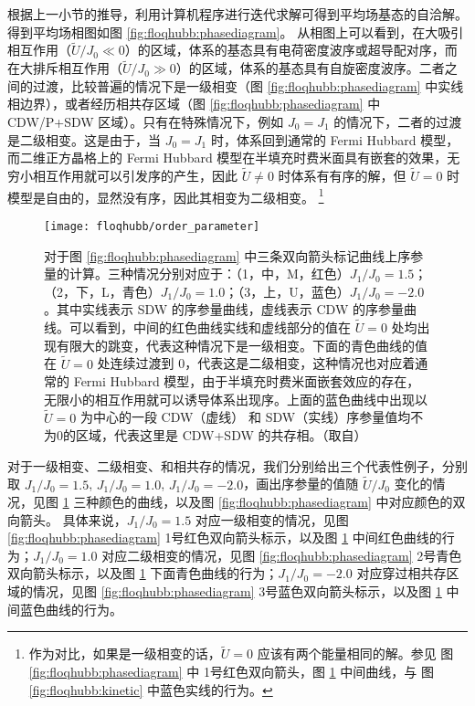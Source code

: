 根据上一小节的推导，利用计算机程序进行迭代求解可得到平均场基态的自洽解。得到平均场相图如图 \ref{fig:floqhubb:phasediagram}。
从相图上可以看到，在大吸引相互作用（$\tilde{U}/J_0\ll0$）的区域，体系的基态具有电荷密度波序或超导配对序，而在大排斥相互作用（$\tilde{U}/J_0\gg0$）的区域，体系的基态具有自旋密度波序。二者之间的过渡，比较普遍的情况下是一级相变（图 \ref{fig:floqhubb:phasediagram} 中实线相边界），或者经历相共存区域（图 \ref{fig:floqhubb:phasediagram} 中 CDW/P+SDW 区域）。只有在特殊情况下，例如 $J_0=J_1$ 的情况下，二者的过渡是二级相变。这是由于，当 $J_0=J_1$ 时，体系回到通常的 Fermi Hubbard 模型，而二维正方晶格上的 Fermi Hubbard 模型在半填充时费米面具有嵌套的效果，无穷小相互作用就可以引发序的产生，因此 $\tilde{U}\neq0$ 时体系有有序的解，但 $\tilde{U}=0$ 时模型是自由的，显然没有序，因此其相变为二级相变。
\footnote{作为对比，如果是一级相变的话，$\tilde{U}=0$ 应该有两个能量相同的解。参见
图 \ref{fig:floqhubb:phasediagram} 中 1号红色双向箭头，图 \ref{fig:floqhubb:orderparameter} 中间曲线，与
图 \ref{fig:floqhubb:kinetic} 中蓝色实线的行为。}

\begin{figure}[t]
\centering
\texttt{[image: floqhubb/order\_parameter]}
\caption{对于图 \ref{fig:floqhubb:phasediagram} 中三条双向箭头标记曲线上序参量的计算。三种情况分别对应于：（1，中，M，红色）$J_1/J_0=1.5$；（2，下，L，青色）$J_1/J_0=1.0$；（3，上，U，蓝色）$J_1/J_0=-2.0$。其中实线表示 SDW 的序参量曲线，虚线表示 CDW 的序参量曲线。可以看到，中间的红色曲线实线和虚线部分的值在 $\tilde{U}=0$ 处均出现有限大的跳变，代表这种情况下是一级相变。下面的青色曲线的值在 $\tilde{U}=0$ 处连续过渡到 0，代表这是二级相变，这种情况也对应着通常的 Fermi Hubbard 模型，由于半填充时费米面嵌套效应的存在，无限小的相互作用就可以诱导体系出现序\cite{nagaosa}。上面的蓝色曲线中出现以 $\tilde{U}=0$ 为中心的一段 CDW（虚线） 和 SDW（实线）序参量值均不为0的区域，代表这里是 CDW+SDW 的共存相。（取自）}
\label{fig:floqhubb:orderparameter}
\end{figure}

对于一级相变、二级相变、和相共存的情况，我们分别给出三个代表性例子，分别取 $J_1/J_0=1.5$, $J_1/J_0=1.0$, $J_1/J_0=-2.0$，画出序参量的值随 $\tilde{U}/J_0$ 变化的情况，见图 \ref{fig:floqhubb:orderparameter} 三种颜色的曲线，以及图 \ref{fig:floqhubb:phasediagram} 中对应颜色的双向箭头。 具体来说，$J_1/J_0=1.5$ 对应一级相变的情况，见图 \ref{fig:floqhubb:phasediagram} 1号红色双向箭头标示，以及图 \ref{fig:floqhubb:orderparameter} 中间红色曲线的行为；$J_1/J_0=1.0$ 对应二级相变的情况，见图 \ref{fig:floqhubb:phasediagram} 2号青色双向箭头标示，以及图 \ref{fig:floqhubb:orderparameter} 下面青色曲线的行为；$J_1/J_0=-2.0$ 对应穿过相共存区域的情况，见图 \ref{fig:floqhubb:phasediagram} 3号蓝色双向箭头标示，以及图 \ref{fig:floqhubb:orderparameter} 中间蓝色曲线的行为。


